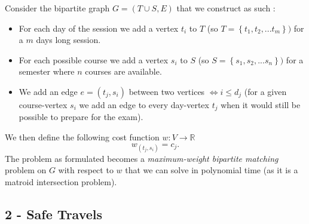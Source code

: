 \documentclass{article}
\begin{document}
\begin{flushleft}
Consider the bipartite graph $G = (T \cup S, E)$ that we construct as such :
\begin{itemize}
    \item For each day of the session we add a vertex $t_i$ to $T$ (so $T = \left\lbrace t_1, t_2, ... t_m \right\rbrace)$ for a $m$ days long session.
    \item For each possible course we add a vertex $s_i$ to $S$ (so $S = \left\lbrace s_1, s_2, ... s_n \right\rbrace)$ for a semester where $n$ courses are available.
    \item We add an edge $e=(t_j,s_i)$ between two vertices $\iff i \leq d_j$ (for a given course-vertex $s_i$ we add an edge to every day-vertex $t_j$ when it would still be possible to prepare for the exam).
\end{itemize}
We then define the following cost function $w : V \rightarrow \mathbb{R}$
\[ w_{(t_j,s_i)} = c_j. \]
The problem as formulated becomes a \textit{maximum-weight bipartite matching} problem on $G$ with respect to $w$ that we can solve in polynomial time (as it is a matroid intersection problem).
\newpage

\subsection*{2 - Safe Travels}


\end{flushleft}
\end{document}
